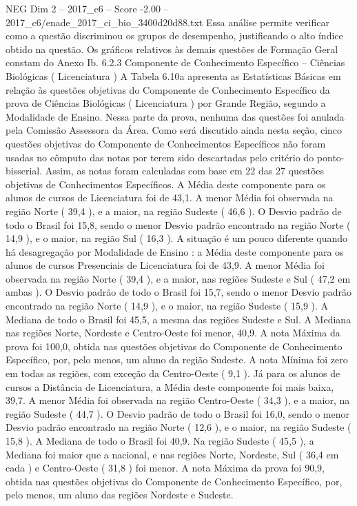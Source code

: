 \begin{textsample}{NEG Dim 2 – 2017\_c6 – Score -2.00 – 2017\_c6/enade\_2017\_ci\_bio\_3400d20d88.txt}
Essa análise permite verificar como a questão discriminou os grupos de desempenho, justificando o alto índice obtido na questão.
Os gráficos relativos às demais questões de Formação Geral constam do Anexo Ib. 6.2.3 Componente de Conhecimento Específico – Ciências Biológicas ( Licenciatura ) A Tabela 6.10a apresenta as Estatísticas Básicas em relação às questões objetivas do Componente de Conhecimento Específico da prova de Ciências Biológicas ( Licenciatura ) por Grande Região, segundo a Modalidade de Ensino.
Nessa parte da prova, nenhuma das questões foi anulada pela Comissão Assessora da Área.
Como será discutido ainda nesta seção, cinco questões objetivas do Componente de Conhecimentos Específicos não foram usadas no cômputo das notas por terem sido descartadas pelo critério do ponto-bisserial.
Assim, as notas foram calculadas com base em 22 das 27 questões objetivas de Conhecimentos Específicos.
A Média deste componente para os alunos de cursos de Licenciatura foi de 43,1.
A menor Média foi observada na região Norte ( 39,4 ), e a maior, na região Sudeste ( 46,6 ).
O Desvio padrão de todo o Brasil foi 15,8, sendo o menor Desvio padrão encontrado na região Norte ( 14,9 ), e o maior, na região Sul ( 16,3 ).
A situação é um pouco diferente quando há desagregação por Modalidade de Ensino : a Média deste componente para os alunos de cursos Presenciais de Licenciatura foi de 43,9.
A menor Média foi observada na região Norte ( 39,4 ), e a maior, nas regiões Sudeste e Sul ( 47,2 em ambas ).
O Desvio padrão de todo o Brasil foi 15,7, sendo o menor Desvio padrão encontrado na região Norte ( 14,9 ), e o maior, na região Sudeste ( 15,9 ).
A Mediana de todo o Brasil foi 45,5, a mesma das regiões Sudeste e Sul.
A Mediana nas regiões Norte, Nordeste e Centro-Oeste foi menor, 40,9.
A nota Máxima da prova foi 100,0, obtida nas questões objetivas do Componente de Conhecimento Específico, por, pelo menos, um aluno da região Sudeste.
A nota Mínima foi zero em todas as regiões, com exceção da Centro-Oeste ( 9,1 ).
Já para os alunos de cursos a Distância de Licenciatura, a Média deste componente foi mais baixa, 39,7.
A menor Média foi observada na região Centro-Oeste ( 34,3 ), e a maior, na região Sudeste ( 44,7 ).
O Desvio padrão de todo o Brasil foi 16,0, sendo o menor Desvio padrão encontrado na região Norte ( 12,6 ), e o maior, na região Sudeste ( 15,8 ).
A Mediana de todo o Brasil foi 40,9.
Na região Sudeste ( 45,5 ), a Mediana foi maior que a nacional, e nas regiões Norte, Nordeste, Sul ( 36,4 em cada ) e Centro-Oeste ( 31,8 ) foi menor.
A nota Máxima da prova foi 90,9, obtida nas questões objetivas do Componente de Conhecimento Específico, por, pelo menos, um aluno das regiões Nordeste e Sudeste.

\end{textsample}
